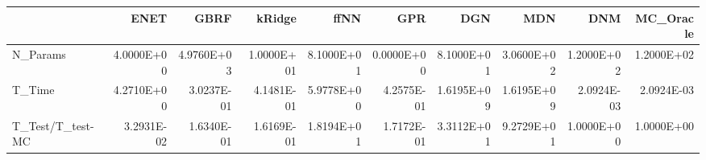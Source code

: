 \begin{tabular}{lrrrrrrrrr}
\toprule
{} &       ENET &       GBRF &     kRidge &       ffNN &        GPR &        DGN &        MDN &        DNM &  MC\_Oracle \\
\midrule
N\_Params         & 4.0000E+00 & 4.9760E+03 & 1.0000E+01 & 8.1000E+01 & 0.0000E+00 & 8.1000E+01 & 3.0600E+02 & 1.2000E+02 & 1.2000E+02 \\
T\_Time           & 4.2710E+00 & 3.0237E-01 & 4.1481E-01 & 5.9778E+00 & 4.2575E-01 & 1.6195E+09 & 1.6195E+09 & 2.0924E-03 & 2.0924E-03 \\
T\_Test/T\_test-MC & 3.2931E-02 & 1.6340E-01 & 1.6169E-01 & 1.8194E+01 & 1.7172E-01 & 3.3112E+01 & 9.2729E+01 & 1.0000E+00 & 1.0000E+00 \\
\bottomrule
\end{tabular}
